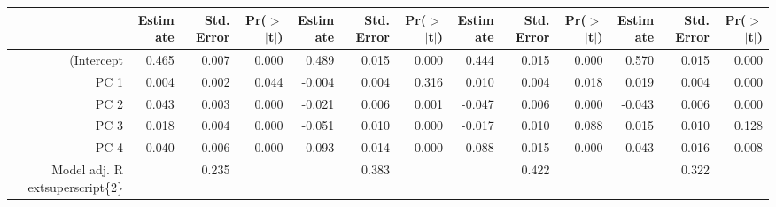 \begin{table}[ht]
\centering
\begin{tabular}{rrrrrrrrrrrrr}
  \hline
 & Estimate & Std. Error & Pr($>$$|$t$|$) & Estimate & Std. Error & Pr($>$$|$t$|$) & Estimate & Std. Error & Pr($>$$|$t$|$) & Estimate & Std. Error & Pr($>$$|$t$|$) \\ 
  \hline
(Intercept & 0.465 & 0.007 & 0.000 & 0.489 & 0.015 & 0.000 & 0.444 & 0.015 & 0.000 & 0.570 & 0.015 & 0.000 \\ 
  PC 1 & 0.004 & 0.002 & 0.044 & -0.004 & 0.004 & 0.316 & 0.010 & 0.004 & 0.018 & 0.019 & 0.004 & 0.000 \\ 
  PC 2 & 0.043 & 0.003 & 0.000 & -0.021 & 0.006 & 0.001 & -0.047 & 0.006 & 0.000 & -0.043 & 0.006 & 0.000 \\ 
  PC 3 & 0.018 & 0.004 & 0.000 & -0.051 & 0.010 & 0.000 & -0.017 & 0.010 & 0.088 & 0.015 & 0.010 & 0.128 \\ 
  PC 4 & 0.040 & 0.006 & 0.000 & 0.093 & 0.014 & 0.000 & -0.088 & 0.015 & 0.000 & -0.043 & 0.016 & 0.008 \\ 
  Model adj. R	extsuperscript\{2\} &  & 0.235 &  &  & 0.383 &  &  & 0.422 &  &  & 0.322 &  \\ 
   \hline
\end{tabular}
\end{table}
